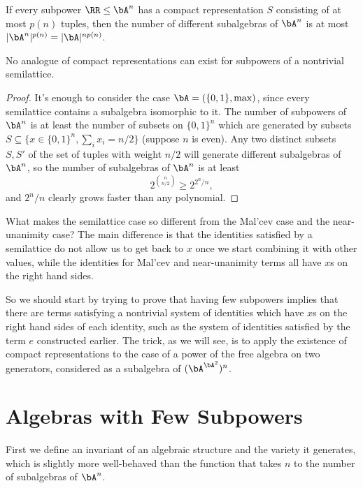 \begin{prop} If every subpower $\RR \le \bA^n$ has a compact representation $S$ consisting of at most $p(n)$ tuples, then the number of different subalgebras of $\bA^n$ is at most $|\bA^n|^{p(n)} = |\bA|^{np(n)}$.
\end{prop}

\begin{cor} No analogue of compact representations can exist for subpowers of a nontrivial semilattice.
\end{cor}
\begin{proof} It's enough to consider the case $\bA = (\{0,1\},\max)$, since every semilattice contains a subalgebra isomorphic to it. The number of subpowers of $\bA^n$ is at least the number of subsets on $\{0,1\}^n$ which are generated by subsets $S \subseteq \{x \in \{0,1\}^n, \sum_i x_i = n/2\}$ (suppose $n$ is even). Any two distinct subsets $S, S'$ of the set of tuples with weight $n/2$ will generate different subalgebras of $\bA^n$, so the number of subalgebras of $\bA^n$ is at least
\[
2^{\binom{n}{n/2}} \ge 2^{2^n/n},
\]
and $2^n/n$ clearly grows faster than any polynomial.
\end{proof}

What makes the semilattice case so different from the Mal'cev case and the near-unanimity case? The main difference is that the identities satisfied by a semilattice do not allow us to get back to $x$ once we start combining it with other values, while the identities for Mal'cev and near-unanimity terms all have $x$s on the right hand sides.

So we should start by trying to prove that having few subpowers implies that there are terms satisfying a nontrivial system of identities which have $x$s on the right hand sides of each identity, such as the system of identities satisfied by the term $e$ constructed earlier. The trick, as we will see, is to apply the existence of compact representations to the case of a power of the free algebra on two generators, considered as a subalgebra of $(\bA^{\bA^2})^n$.


\section{Algebras with Few Subpowers}

First we define an invariant of an algebraic structure and the variety it generates, which is slightly more well-behaved than the function that takes $n$ to the number of subalgebras of $\bA^n$.

